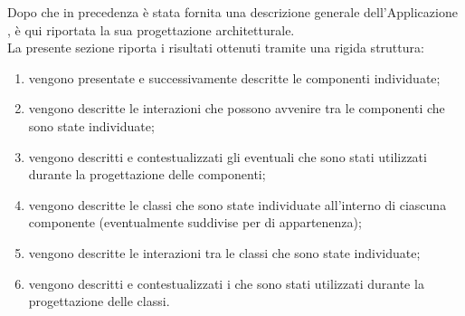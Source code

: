    Dopo che in precedenza è stata fornita una descrizione generale dell'Applicazione , è qui riportata la sua progettazione architetturale.\\
    La presente sezione riporta i risultati ottenuti tramite una rigida struttura:
    \begin{enumerate}
        \item vengono presentate e successivamente descritte le componenti individuate;
        \item vengono descritte le interazioni che possono avvenire tra le componenti che sono state individuate;
        \item vengono descritti e contestualizzati gli eventuali  che sono stati utilizzati durante la progettazione delle componenti;
        \item vengono descritte le classi che sono state individuate all'interno di ciascuna componente (eventualmente suddivise per  di appartenenza);
        \item vengono descritte le interazioni tra le classi che sono state individuate;
        \item vengono descritti e contestualizzati i  che sono stati utilizzati durante la progettazione delle classi.
    \end{enumerate}
	
